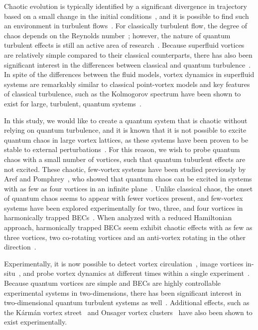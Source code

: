 Chaotic evolution is typically identified by a significant divergence in trajectory based on a small change in the initial conditions~\cite{strogatz2018}, and it is possible to find such an environment in turbulent flows~\cite{spiegel1987, biferale2005}.
For classically turbulent flow, the degree of chaos depends on the Reynolds number~\cite{berera2018}; however, the nature of quantum turbulent effects is still an active area of research~\cite{white2014}.
Because superfluid vortices are relatively simple compared to their classical counterparts, there has also been significant interest in the differences between classical and quantum turbulence~\cite{nemirovskii1995,kyriakopoulos2014,koukouloyannis2014,navarro2013}.
In spite of the differences between the fluid models, vortex dynamics in superfluid systems are remarkably similar to classical point-vortex models and key features of classical turbulence, such as the Kolmogorov spectrum have been shown to exist for large, turbulent, quantum systems~\cite{nore1997,stalp1999,araki2002,salort2010}.

In this study, we would like to create a quantum system that is chaotic without relying on quantum turbulence, and
it is known that it is not possible to excite quantum chaos in large vortex lattices, as these systems have been proven to be stable to external perturbations~\cite{o2017}.
For this reason, we wish to probe quantum chaos with a small number of vortices, such that quantum tuburlent effects are not excited.
These chaotic, few-vortex systems have been studied previously by Aref and Pomphrey~\cite{aref1982, aref1980, aref1983}, who showed that quantum chaos can be excited in systems with as few as four vortices in an infinite plane~\cite{aref1982}.
Unlike classical chaos, the onset of quantum chaos seems to appear with fewer vortices present, and few-vortex systems have been explored experimentally for two, three, and four vortices in harmonically trapped BECs~\cite{navarro2013}.
When analyzed with a reduced Hamiltonian approach, harmonically trapped BECs seem exhibit chaotic effects with as few as three vortices, two co-rotating vortices and an anti-vortex rotating in the other direction~\cite{kyriakopoulos2014,koukouloyannis2014}.

Experimentally, it is now possible to detect vortex circulation~\cite{seo2017}, image vortices in-situ~\cite{wilson2015}, and probe vortex dynamics at different times within a single experiment~\cite{freilich2010, serafini2017}.
Because quantum vortices are simple and BECs are highly controllable experimental systems in two-dimensions, there has been significant interest in two-dimensional quantum turbulent systems as well~\cite{neely2013,shin2004}.
Additional effects, such as the K\'arm\'an vortex street~\cite{kwon2014} and Onsager vortex clusters~\cite{gauthier2018,johnstone2018} have also been shown to exist experimentally.

